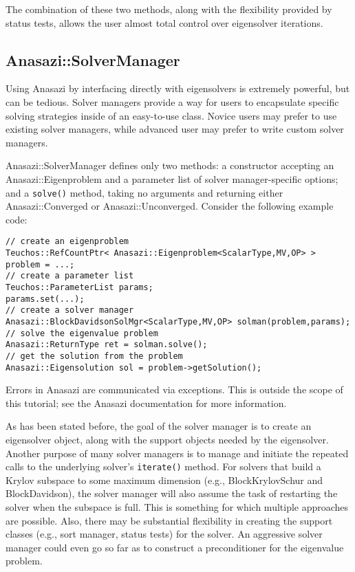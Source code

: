 The combination of these two methods, along with the flexibility provided by status tests,
allows the user almost total control over eigensolver iterations.


\subsection{Anasazi::SolverManager}
\label{sec:anasazi:solvermanager}

Using Anasazi by interfacing directly with eigensolvers is extremely powerful, but can be
tedious. Solver managers provide a way for users to encapsulate specific solving
strategies inside of an easy-to-use class. Novice users may prefer to use existing solver
managers, while advanced user may prefer to write custom solver managers.

Anasazi::SolverManager defines only two methods: a constructor accepting an
Anasazi::\-Eigenproblem and a parameter list of solver manager-specific options; and a
\verb!solve()! method, taking no arguments and returning 
either Anasazi::Converged or Anasazi::Unconverged.
Consider the following example code:
\begin{verbatim}
// create an eigenproblem
Teuchos::RefCountPtr< Anasazi::Eigenproblem<ScalarType,MV,OP> > problem = ...;
// create a parameter list
Teuchos::ParameterList params;
params.set(...);
// create a solver manager
Anasazi::BlockDavidsonSolMgr<ScalarType,MV,OP> solman(problem,params);
// solve the eigenvalue problem
Anasazi::ReturnType ret = solman.solve();
// get the solution from the problem
Anasazi::Eigensolution sol = problem->getSolution();
\end{verbatim}

\begin{remark}
  Errors in Anasazi are communicated via exceptions. This is outside the scope of this
  tutorial; see the Anasazi documentation for more information.
\end{remark}

As has been stated before, the goal of the solver manager is to create an eigensolver
object, along with the support objects needed by the eigensolver. Another purpose of many
solver managers is to manage and initiate the repeated calls to the underlying solver's
\verb!iterate()! method. For solvers that build a Krylov subspace to some maximum
dimension (e.g., BlockKrylovSchur and BlockDavidson), the solver manager will also assume
the task of restarting the solver when the subspace is full. This is something for which
multiple approaches are possible. Also, there may be substantial flexibility in creating
the support classes (e.g., sort manager, status tests) for the solver. An aggressive
solver manager could even go so far as to construct a preconditioner for the eigenvalue
problem. 

